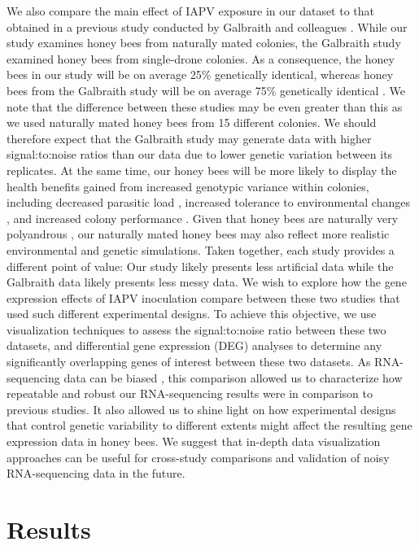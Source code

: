\documentclass{bmcart}
\begin{document}
\begin{linenumbers}
\begin{doublespacing}
We also compare the main effect of IAPV exposure in our dataset to that obtained in a previous study conducted by Galbraith and colleagues \cite{galbraith}. While our study examines honey bees from naturally mated colonies, the Galbraith study examined honey bees from single-drone colonies. As a consequence, the honey bees in our study will be on average 25\% genetically identical, whereas honey bees from the Galbraith study will be on average 75\% genetically identical \cite{sisters}. We note that the difference between these studies may be even greater than this as we used naturally mated honey bees from 15 different colonies. We should therefore expect that the Galbraith study may generate data with higher signal:to:noise ratios than our data due to lower genetic variation between its replicates. At the same time, our honey bees will be more likely to display the health benefits gained from increased genotypic variance within colonies, including decreased parasitic load \cite{multParasite}, increased tolerance to environmental changes \cite{divHyp2}, and increased colony performance \cite{geneticDiverse, geneticDiverse2}. Given that honey bees are naturally very polyandrous \cite{patriline}, our naturally mated honey bees may also reflect more realistic environmental and genetic simulations. Taken together, each study provides a different point of value: Our study likely presents less artificial data while the Galbraith data likely presents less messy data. We wish to explore how the gene expression effects of IAPV inoculation compare between these two studies that used such different experimental designs. To achieve this objective, we use visualization techniques to assess the signal:to:noise ratio between these two datasets, and differential gene expression (DEG) analyses to determine any significantly overlapping genes of interest between these two datasets. As RNA-sequencing data can be biased \cite{biased1, biased2, biased3}, this comparison allowed us to characterize how repeatable and robust our RNA-sequencing results were in comparison to previous studies. It also allowed us to shine light on how experimental designs that control genetic variability to different extents might affect the resulting gene expression data in honey bees. We suggest that in-depth data visualization approaches can be useful for cross-study comparisons and validation of noisy RNA-sequencing data in the future.

\section*{Results}


\end{doublespacing}
\end{linenumbers}
\end{document}
